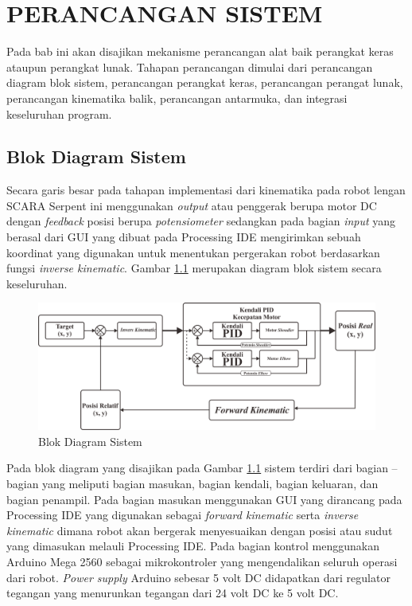 
\chapter{PERANCANGAN SISTEM}
Pada bab ini akan disajikan mekanisme perancangan alat baik perangkat keras ataupun perangkat lunak. Tahapan perancangan dimulai dari perancangan diagram blok sistem, perancangan perangkat keras, perancangan perangat lunak, perancangan kinematika balik, perancangan antarmuka, dan integrasi keseluruhan program. 
\section{ Blok Diagram Sistem }
Secara garis besar pada tahapan implementasi dari kinematika pada robot lengan SCARA Serpent ini menggunakan \textit{output} atau penggerak berupa motor DC dengan \textit{feedback} posisi berupa \textit{potensiometer} sedangkan pada bagian  \textit{input} yang berasal dari GUI yang dibuat pada Processing IDE mengirimkan sebuah koordinat yang digunakan untuk menentukan pergerakan robot berdasarkan fungsi \textit{inverse kinematic}. Gambar \ref{pic.diagram.bloksistem} merupakan diagram blok sistem secara keseluruhan.
\begin{figure}[H]
	\centering
	\includegraphics[width=13cm]{gambar/diagram_blok_new.png}
	\caption{Blok Diagram Sistem}
	\label{pic.diagram.bloksistem}
\end{figure}
Pada blok diagram yang disajikan pada Gambar \ref{pic.diagram.bloksistem} sistem terdiri dari bagian – bagian yang meliputi bagian masukan, bagian kendali, bagian keluaran, dan bagian penampil. Pada bagian masukan menggunakan GUI yang dirancang pada Processing IDE yang digunakan sebagai \textit{forward kinematic} serta \textit{inverse kinematic} dimana robot akan bergerak menyesuaikan dengan posisi atau sudut yang dimasukan melauli Processing IDE. 
Pada bagian kontrol menggunakan Arduino Mega 2560 sebagai mikrokontroler yang mengendalikan seluruh operasi dari robot. \textit{Power supply} Arduino sebesar 5 volt DC didapatkan dari regulator tegangan yang menurunkan tegangan dari 24 volt DC ke 5 volt DC. 

